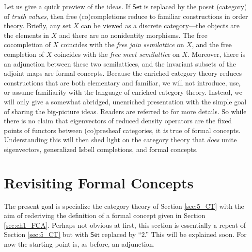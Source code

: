Let us give a quick preview of the ideas. If $\mathsf{Set}$ is replaced by the poset (category) of \textit{truth values}, then free (co)completions reduce to familiar constructions in order theory. Briefly, any set $X$ can be viewed as a discrete category---the objects are the elements in $X$ and there are no nonidentity morphisms. The free cocompletion of $X$ coincides with the \emph{free join semilattice} on $X$, and the free completion of $X$ coincides with the \emph{free meet semilattice} on $X$. Moreover, there is an adjunction between these two semilattices, and the invariant subsets of the adjoint maps are formal concepts.  Because the enriched category theory reduces constructions that are both elementary and familiar, we will not introduce, use, or assume familiarity with the language of enriched category theory. Instead, we will only give a somewhat abridged, unenriched presentation with the simple goal of sharing the big-picture ideas. Readers are referred to \cite{lawvere1973,willerton2014,willerton2015legendrefenchel,Elliott2017OnTF,kelly1982basic} for more details. So while there is no claim that eigenvectors of reduced density operators are the fixed points of functors between (co)presheaf categories, it \textit{is} true of formal concepts. Understanding this will then shed light on the category theory that \textit{does} unite eigenvectors, generalized Isbell completions, and formal concepts.

\section{Revisiting Formal Concepts}\label{sec:5_FCA}
The present goal is specialize the category theory of Section \ref{sec:5_CT} with the aim of rederiving the definition of a formal concept given in Section \ref{sec:ch1_FCA}. Perhaps not obvious at first, this section is essentially a repeat of Section \ref{sec:5_CT} but with $\mathsf{Set}$ replaced by ``$2$.'' This will be explained soon. For now the starting point is, as before, an adjunction.

